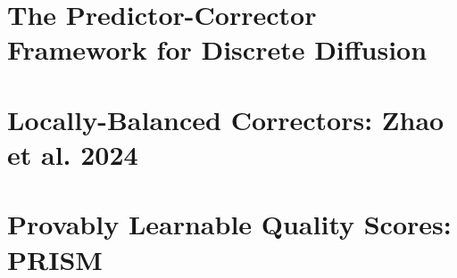 \section{The Predictor-Corrector Framework for Discrete Diffusion}
\label{sec:pc-discrete}


\section{Locally-Balanced Correctors: Zhao et al. 2024}
\label{sec:zhao-correctors}


\section{Provably Learnable Quality Scores: PRISM}
\label{sec:prism}


